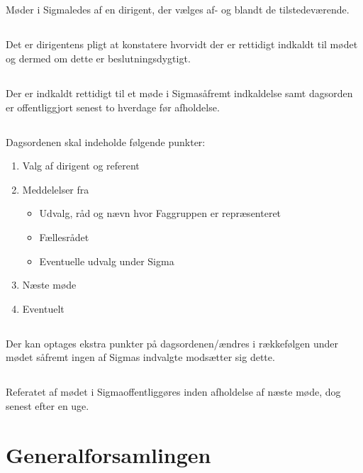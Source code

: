 \documentclass[danish,a4paper,twocolumn]{article}
\newcommand{\foreningen}{Sigma}
\begin{document}
\subsection{}Møder i \foreningen ledes af en dirigent, der vælges af- og blandt de tilstedeværende.
\subsection{}Det er dirigentens pligt at konstatere hvorvidt der er rettidigt indkaldt til mødet og dermed om dette er beslutningsdygtigt.
\subsection{}Der er indkaldt rettidigt til et møde i \foreningen såfremt indkaldelse samt dagsorden er offentliggjort senest to hverdage før afholdelse.
\subsection{}Dagsordenen skal indeholde følgende punkter:
\begin{enumerate}
        \item Valg af dirigent og referent
        \item Meddelelser fra
        \begin{itemize}
                \item Udvalg, råd og nævn hvor Faggruppen er repræsenteret
                \item Fællesrådet
                \item Eventuelle udvalg under \foreningen
        \end{itemize}
        \item Næste møde
        \item Eventuelt
\end{enumerate}
\subsection{}Der kan optages ekstra punkter på dagsordenen/ændres i rækkefølgen under mødet såfremt ingen af \foreningen s indvalgte modsætter sig dette.
\subsection{}Referatet af mødet i \foreningen offentliggøres inden afholdelse af næste møde, dog senest efter en uge.
 
\section{Generalforsamlingen}
\end{document}
